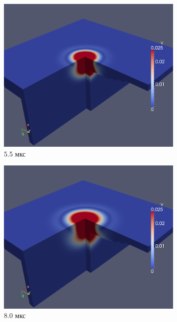 \begin{figure}[htp]
\begin{subfigure}[b]{0.5\textwidth}
\centering
\includegraphics[width=\textwidth]{png/pkm-experiment/wing-stringer/wave-3d/v-0009.png}
\caption{5.5 мкс}
\end{subfigure}
\begin{subfigure}[b]{0.5\textwidth}
\centering
\includegraphics[width=\textwidth]{png/pkm-experiment/wing-stringer/wave-3d/v-0013.png}
\caption{8.0 мкс}
\end{subfigure}
\begin{subfigure}[b]{0.5\textwidth}

\end{subfigure}
\end{figure}
